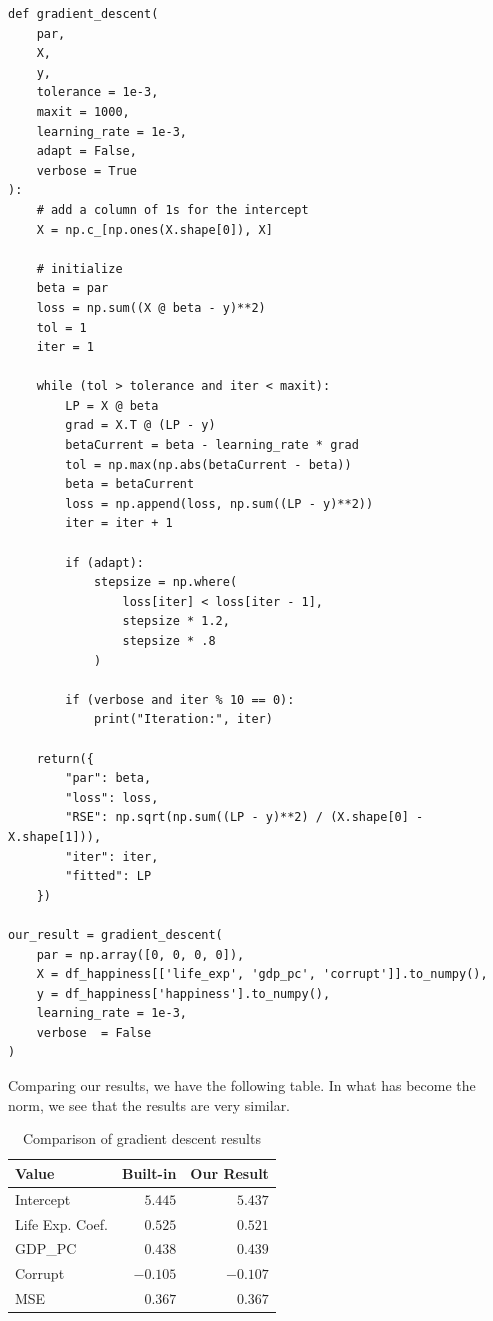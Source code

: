 \documentclass[
  letterpaper,
]{krantz}
\begin{document}
\begin{verbatim}
def gradient_descent(
    par, 
    X, 
    y, 
    tolerance = 1e-3, 
    maxit = 1000, 
    learning_rate = 1e-3, 
    adapt = False, 
    verbose = True
):
    # add a column of 1s for the intercept
    X = np.c_[np.ones(X.shape[0]), X]
    
    # initialize
    beta = par
    loss = np.sum((X @ beta - y)**2)
    tol = 1
    iter = 1

    while (tol > tolerance and iter < maxit):
        LP = X @ beta
        grad = X.T @ (LP - y)
        betaCurrent = beta - learning_rate * grad
        tol = np.max(np.abs(betaCurrent - beta))
        beta = betaCurrent
        loss = np.append(loss, np.sum((LP - y)**2))
        iter = iter + 1

        if (adapt):
            stepsize = np.where(
                loss[iter] < loss[iter - 1], 
                stepsize * 1.2, 
                stepsize * .8
            )

        if (verbose and iter % 10 == 0):
            print("Iteration:", iter)

    return({
        "par": beta,
        "loss": loss,
        "RSE": np.sqrt(np.sum((LP - y)**2) / (X.shape[0] - X.shape[1])),
        "iter": iter,
        "fitted": LP
    })

our_result = gradient_descent(
    par = np.array([0, 0, 0, 0]),
    X = df_happiness[['life_exp', 'gdp_pc', 'corrupt']].to_numpy(),
    y = df_happiness['happiness'].to_numpy(),
    learning_rate = 1e-3,
    verbose  = False
)
\end{verbatim}

Comparing our results, we have the following table. In what has become
the norm, we see that the results are very similar.

\hypertarget{tbl-gradient-descent}{}
\begin{longtable}{lrr}
\caption{\label{tbl-gradient-descent}Comparison of gradient descent results }\tabularnewline

\toprule
Value & Built-in & Our Result \\ 
\midrule\addlinespace[2.5pt]
Intercept & \textcolor[HTML]{404040}{$5.445$} & \textcolor[HTML]{404040}{$5.437$} \\ 
Life Exp. Coef. & \textcolor[HTML]{404040}{$0.525$} & \textcolor[HTML]{404040}{$0.521$} \\ 
GDP\_PC & \textcolor[HTML]{404040}{$0.438$} & \textcolor[HTML]{404040}{$0.439$} \\ 
Corrupt & \textcolor[HTML]{404040}{$-0.105$} & \textcolor[HTML]{404040}{$-0.107$} \\ 
MSE & \textcolor[HTML]{404040}{$0.367$} & \textcolor[HTML]{404040}{$0.367$} \\ 
\bottomrule
\end{longtable}
\end{document}
